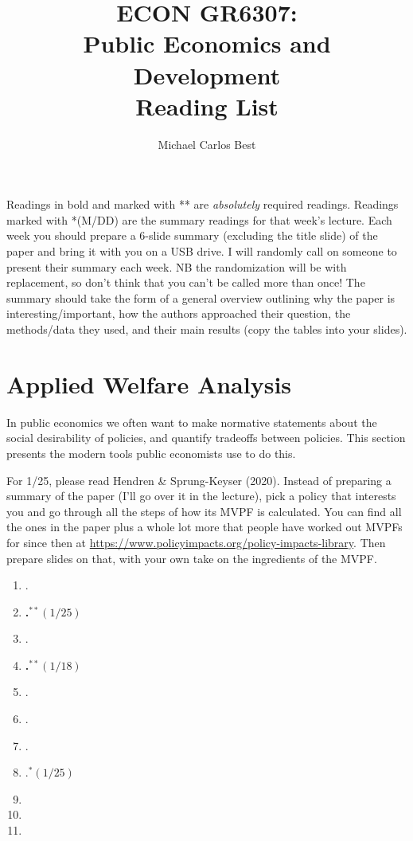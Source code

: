 \documentclass[11pt]{article}
\begin{document}
\title{ECON GR6307: \\ Public Economics and Development \\ Reading List}
\author{Michael Carlos Best}

\maketitle

Readings in bold and marked with ** are \textit{absolutely} required readings. Readings marked with *(M/DD) are the summary readings for that week's lecture. Each week you should prepare a 6-slide summary (excluding the title slide) of the paper and bring it with you on a USB drive. I will randomly call on someone to present their summary each week. NB the randomization will be with replacement, so don't think that you can't be called more than once! The summary should take the form of a general overview outlining why the paper is interesting/important, how the authors approached their question, the methods/data they used, and their main results (copy the tables into your slides).

\section{Applied Welfare Analysis}

In public economics we often want to make normative statements about the social desirability of policies, and quantify tradeoffs between policies. This section presents the modern tools public economists use to do this. 

For 1/25, please read Hendren \& Sprung-Keyser (2020). Instead of preparing a summary of the paper (I'll go over it in the lecture), pick a policy that interests you and go through all the steps of how its MVPF is calculated. You can find all the ones in the paper plus a whole lot more that people have worked out MVPFs for since then at \url{https://www.policyimpacts.org/policy-impacts-library}. Then prepare slides on that, with your own take on the ingredients of the MVPF.

\begin{enumerate}
\item {}.
\item \textbf{.$^{**}(1/25)$}
\item {}.
\item \textbf{.$^{**}(1/18)$}
\item {}.
\item {}.
\item {}.
\item {}.$^{*}(1/25)$
\item {}
\item {}
\item {}
\end{enumerate}
\end{document}
